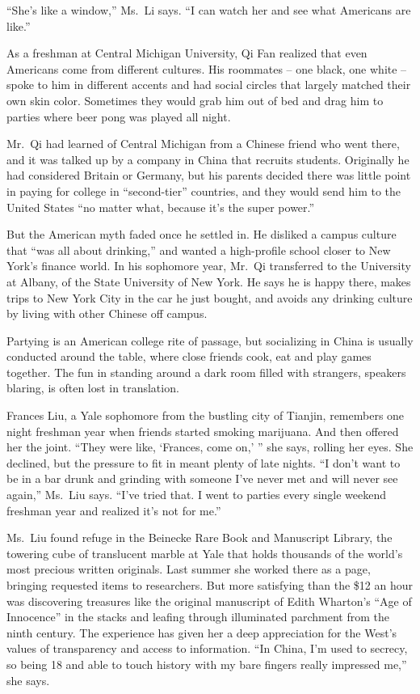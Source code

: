 ﻿\documentclass[12pt]{article}
\begin{document}
``She's like a window,'' Ms.~Li says. ``I can watch her and see what Americans are like.''

As a freshman at Central Michigan University, Qi Fan realized that even Americans come from
different cultures. His roommates -- one black, one white -- spoke to him in different accents and
had social circles that largely matched their own skin color. Sometimes they would grab him out of
bed and drag him to parties where beer pong was played all night.

Mr.~Qi had learned of Central Michigan from a Chinese friend who went there, and it was talked up by
a company in China that recruits students. Originally he had considered Britain or Germany, but his
parents decided there was little point in paying for college in ``second-tier'' countries, and they
would send him to the United States ``no matter what, because it's the super power.'' 

But the American myth faded once he settled in. He disliked a campus culture that ``was all about
drinking,'' and wanted a high-profile school closer to New York's finance world. In his sophomore
year, Mr.~Qi transferred to the University at Albany, of the State University of New York. He says
he is happy there, makes trips to New York City in the car he just bought, and avoids any drinking
culture by living with other Chinese off campus.

Partying is an American college rite of passage, but socializing in China is usually conducted
around the table, where close friends cook, eat and play games together. The fun in standing around
a dark room filled with strangers, speakers blaring, is often lost in translation.

Frances Liu, a Yale sophomore from the bustling city of Tianjin, remembers one night freshman year
when friends started smoking marijuana. And then offered her the joint. ``They were like, `Frances,
come on,' '' she says, rolling her eyes. She declined, but the pressure to fit in meant plenty of
late nights. ``I don't want to be in a bar drunk and grinding with someone I've never met and will
never see again,'' Ms.~Liu says. ``I've tried that. I went to parties every single weekend freshman
year and realized it's not for me.''

Ms.~Liu found refuge in the Beinecke Rare Book and Manuscript Library, the towering cube of
translucent marble at Yale that holds thousands of the world's most precious written originals. Last
summer she worked there as a page, bringing requested items to researchers. But more satisfying than
the \$12 an hour was discovering treasures like the original manuscript of Edith Wharton's ``Age of
Innocence'' in the stacks and leafing through illuminated parchment from the ninth century. The
experience has given her a deep appreciation for the West's values of transparency and access to
information. ``In China, I'm used to secrecy, so being 18 and able to touch history with my bare
fingers really impressed me,'' she says.
\end{document}
